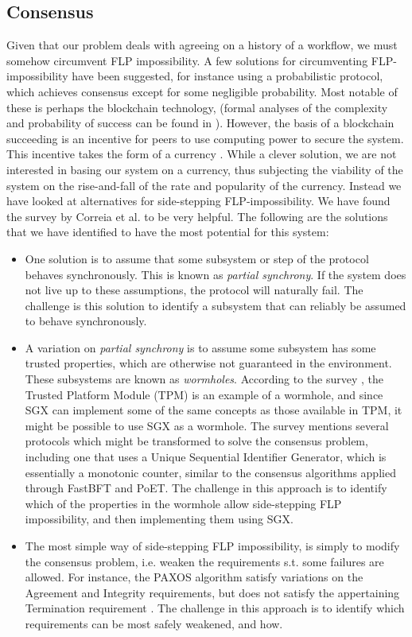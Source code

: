 \documentclass[12pt]{article}
\begin{document}
		\subsection{Consensus}
		Given that our problem deals with agreeing on a history of a workflow, we must somehow circumvent FLP impossibility.
		A few solutions for circumventing FLP-impossibility have been suggested, for instance using a probabilistic protocol, which achieves consensus except for some negligible probability.
		Most notable of these is perhaps the blockchain technology, (formal analyses of the complexity and probability of success can be found in \cite{miller2014anonymous}).
		However, the basis of a blockchain succeeding is an incentive for peers to use computing power to secure the system.
		This incentive takes the form of a currency \cite{bitcoin-white-paper}.
		While a clever solution, we are not interested in basing our system on a currency, thus subjecting the viability of the system on the rise-and-fall of the rate and popularity of the currency. 
		Instead we have looked at alternatives for side-stepping FLP-impossibility. 
		We have found the survey by Correia et al. \cite{consensus-survey} to be very helpful. 
		The following are the solutions that we have identified to have the most potential for this system:
		\begin{itemize}
			\item One solution is to assume that some subsystem or step of the protocol behaves synchronously. 
			This is known as \textit{partial synchrony}. 
			If the system does not live up to these assumptions, the protocol will naturally fail. 
			The challenge is this solution to identify a subsystem that can reliably be assumed to behave synchronously. 
			\item A variation on \textit{partial synchrony} is to assume some subsystem has some trusted properties, which are otherwise not guaranteed in the environment. These subsystems are known as \textit{wormholes}. 
			According to the survey \cite{consensus-survey}, the Trusted Platform Module (TPM) is an example of a wormhole, and since SGX can implement some of the same concepts as those available in TPM, it might be possible to use SGX as a wormhole. 
			The survey mentions several protocols which might be transformed to solve the consensus problem, including one that uses a Unique Sequential Identifier Generator, which is essentially a monotonic counter, similar to the consensus algorithms applied through FastBFT and PoET. 
			The challenge in this approach is to identify which of the properties in the wormhole allow side-stepping FLP impossibility, and then implementing them using SGX.
			\item The most simple way of side-stepping FLP impossibility, is simply to modify the consensus problem, i.e. weaken the requirements s.t. some failures are allowed. 
			For instance, the PAXOS algorithm \cite{paxos} satisfy variations on the Agreement and Integrity requirements, but does not satisfy the appertaining Termination requirement \cite{fast-byz-cons}. 
			The challenge in this approach is to identify which requirements can be most safely weakened, and how.
		\end{itemize}
		
\end{document}
